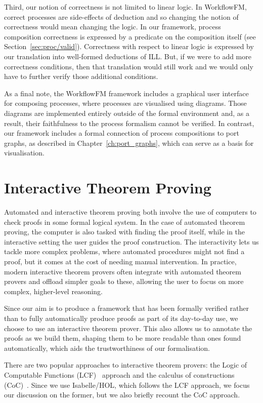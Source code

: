 \documentclass[class=smolathesis,crop=false]{standalone}
\begin{document}
Third, our notion of correctness is not limited to linear logic.
In WorkflowFM, correct processes are side-effects of deduction and so changing the notion of correctness would mean changing the logic.
In our framework, process composition correctness is expressed by a predicate on the composition itself (see Section~\ref{sec:proc/valid}).
Correctness with respect to linear logic is expressed by our translation into well-formed deductions of ILL\@.
But, if we were to add more correctness conditions, then that translation would still work and we would only have to further verify those additional conditions.

As a final note, the WorkflowFM framework includes a graphical user interface for composing processes, where processes are visualised using diagrams.
Those diagrams are implemented entirely outside of the formal environment and, as a result, their faithfulness to the process formalism cannot be verified.
In contrast, our framework includes a formal connection of process compositions to port graphs, as described in Chapter~\ref{ch:port_graphs}, which can serve as a basis for visualisation.

\cbstart
\section{Interactive Theorem Proving}
\label{sec:intro/itp}

Automated and interactive theorem proving both involve the use of computers to check proofs in some formal logical system.
In the case of automated theorem proving, the computer is also tasked with finding the proof itself, while in the interactive setting the user guides the proof construction.
The interactivity lets us tackle more complex problems, where automated procedures might not find a proof, but it comes at the cost of needing manual intervention.
In practice, modern interactive theorem provers often integrate with automated theorem provers and offload simpler goals to these, allowing the user to focus on more complex, higher-level reasoning.

Since our aim is to produce a framework that has been formally verified rather than to fully automatically produce proofs as part of its day-to-day use, we choose to use an interactive theorem prover.
This also allows us to annotate the proofs as we build them, shaping them to be more readable than ones found automatically, which aids the trustworthiness of our formalisation.

There are two popular approaches to interactive theorem provers: the Logic of Computable Functions (LCF)~\cite{scott-1993} approach and the calculus of constructions (CoC)~\cite{coquand_huet-1986}.
Since we use Isabelle/HOL, which follows the LCF approach, we focus our discussion on the former, but we also briefly recount the CoC approach.
\end{document}
